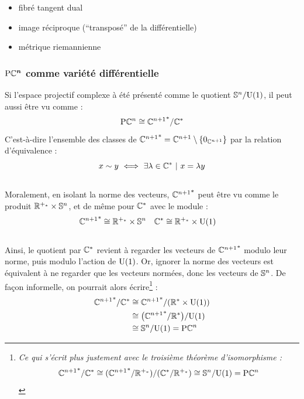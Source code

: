 \begin{itemize}
	
	\item fibré tangent dual
	
	\item image réciproque (``transposé'' de la différentielle)
	
	\item métrique riemannienne
	
\end{itemize}



\subsubsection{\wip $\bf{\PC{n}}$ comme variété différentielle} \label{subsec:PC^n_variet}


Si l'espace projectif complexe à été présenté comme le quotient $\S{n}/\U{1}$, il peut aussi être vu comme :
\[\PC{n} \cong {\C^{n+1}}^*/\C^*\]
C'est-à-dire l'ensemble des classes de ${\C^{n+1}}^* = \C^{n+1} \setminus \{0_{\C^{n+1}}\}$ par la relation d'équivalence :
\[x \sim y\ \Llr\ \exists \lambda\in\C^*\ |\ x=\lambda y\]
\\
Moralement, en isolant la norme des vecteurs, ${\C^{n+1}}^*$ peut être vu comme le produit $\R^{+_*} \times \S{n}$, et de même pour $\C^*$ avec le module :
\begin{align*}
	{\C^{n+1}}^* &\cong \R^{+_*} \times \S{n}  &  \C^* &\cong \R^{+_*} \times \U{1}
\end{align*}
\\
Ainsi, le quotient par $\C^*$ revient à regarder les vecteurs de ${\C^{n+1}}^*$ modulo leur norme, puis modulo l'action de $\U{1}$. Or, ignorer la norme des vecteurs est équivalent à ne regarder que les vecteurs normées, donc les vecteurs de $\S{n}$. De façon informelle, on pourrait alors écrire\footnote{\itshape
	Ce qui s'écrit plus justement avec le troisième théorème d'isomorphisme : \[{\C^{n+1}}^*/\C^* \cong ({\C^{n+1}}^* / \R^{+_*})/(\C^* / \R^{+_*}) \cong \S{n}/\U{1} = \PC{n}\]
} :
\begin{align*}
	{\C^{n+1}}^*/\C^* &\cong {\C^{n+1}}^*/(\R^* \times \U{1})\\
	&\cong \big( {\C^{n+1}}^*/\R^* \big) /\U{1} \\
	&\cong \S{n}  / \U{1} = \PC{n} 
\end{align*}
\skipl

